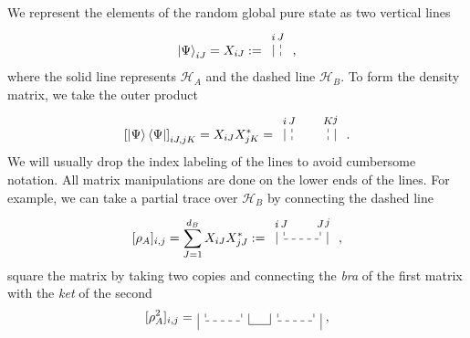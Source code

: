 \documentclass[a4paper,11pt]{article}
\newcommand*{\SR}[1]{\textcolor{magenta}{[SR: \textsf{#1}]}}
\begin{document}
We represent the elements of the random global pure state as two vertical lines
\begin{align}
    \ket{\Psi}_{iJ}= X_{iJ} :=
    \,
    \tikz[baseline=-0.5ex]{
    \draw[dashed] (0,0.2) node[align=center, above] {\footnotesize $J$} -- (0,-0.2);
    \draw (-0.2,0.2) node[align=center, above] {\footnotesize $i$} -- (-0.2,-0.15);
    }\ ,
\end{align}
where the solid line represents $\mathcal{H}_A$ and the dashed line $\mathcal{H}_B$. To form the density matrix, we take the outer product
\begin{align}
    \left[\ket{\Psi}\bra{\Psi}\right]_{iJ,jK}= X_{iJ} X^\ast_{jK}
    =%
    \,
    \tikz[baseline=-0.5ex]{
    \draw[dashed] (0,0.2) node[align=center, above] {\footnotesize $J$} -- (0,-0.2);
    \draw[dashed] (1,0.2) node[align=center, above] {\footnotesize $K$} -- (1,-0.2);
    \draw (-0.2,0.2) node[align=center, above] {\footnotesize $i$} -- (-0.2,-0.15);
    \draw (1.2,0.2) node[align=center, above] {\footnotesize $j$} -- (1.2,-0.15);
    }\ .
\end{align}
We will usually drop the index labeling of the lines to avoid cumbersome notation. All matrix manipulations are done on the lower ends of the lines. For example, we can take a partial trace over $\mathcal{H}_B$ by connecting the dashed line
\begin{align}
    \label{eq:rho_diag}
    [\rho_A]_{i,j}= 
    {\sum_{J=1}^{d_B} 
    X_{iJ} X^\ast_{jJ}}
:= %
\,
    \tikz[scale=1.0,baseline=-0.5ex]{
    \draw[dashed] (0,0.2) node[align=center, above] {\footnotesize $J$} -- (0,0);
    \draw[dashed] (0,0)  -- (1,0);
    \draw[dashed]  (1,0.2) node[align=center, above] {\footnotesize $J$} -- (1,0);
    \draw (-0.2,0.2) node[align=center, above] {\footnotesize $i$} -- (-0.2,-0.15);
    \draw (1.2,0.2) node[align=center, above] {\footnotesize $j$} -- (1.2,-0.15);
    }\ ,
\end{align} 
square the matrix by taking two copies and connecting the \textit{bra} of the first matrix with the \textit{ket} of the second
\begin{align}
\label{eq:tr_r2}
    [\rho_A^2]_{i,j}=  %
    \,
    \tikz[scale=1.0,baseline=0ex]{
    \draw[dashed] (0,0.2)-- (0,0);
    \draw[dashed] (0,0) -- (1,0);
    \draw[dashed]  (1,0.2) -- (1,0);
    \draw (-0.2,0.2)-- (-0.2,-0.25);
    \draw (1.2,-0.1)-- (1.2,0.2);
    \draw[dashed] (2,0.2)-- (2,0);
    \draw[dashed] (2,0) -- (3,0);
    \draw[dashed]  (3,0.2) -- (3,0);
    \draw (1.8,0.2)-- (1.8,-0.1);
    \draw (3.2,-0.25)-- (3.2,0.2);
    \draw (1.2,-0.1)-- (1.8,-0.1);
    }\ ,
\end{align}
\end{document}
